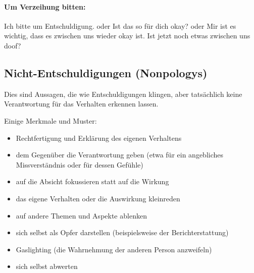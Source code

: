 \paragraph{Um Verzeihung bitten:} \glqq Ich bitte um Entschuldigung.\grqq{} oder \glqq Ist das so für dich okay?\grqq{} oder \glqq Mir ist es wichtig, dass es zwischen uns wieder okay ist. Ist jetzt noch etwas zwischen uns doof?\grqq

\subsection{Nicht-Entschuldigungen (Nonpologys)}

Dies sind Aussagen, die wie Entschuldigungen klingen, aber tatsächlich keine Verantwortung für das Verhalten erkennen lassen.

Einige Merkmale und Muster:

\begin{itemize}
    \item Rechtfertigung und Erklärung des eigenen Verhaltens
    \item dem Gegenüber die Verantwortung geben (etwa für ein angebliches Missverständnis oder für dessen Gefühle)
    \item auf die Absicht fokussieren statt auf die Wirkung
    \item das eigene Verhalten oder die Auswirkung kleinreden
    \item auf andere Themen und Aspekte ablenken
    \item sich selbst als Opfer darstellen (beispielsweise der Berichterstattung)
    \item Gaslighting (die Wahrnehmung der anderen Person anzweifeln)
    \item sich selbst abwerten
\end{itemize}
